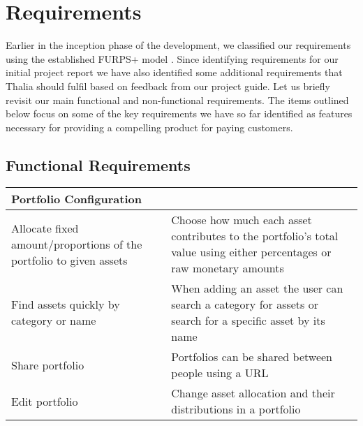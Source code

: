 \documentclass[main.tex]{subfiles}
\begin{document}
\section{Requirements}
Earlier in the inception phase of the development, we classified our requirements using the established FURPS+ model \cite{FURPS}. Since identifying requirements for our initial project report \cite{TR_REQS} we have also identified some additional requirements that Thalia should fulfil based on feedback from our project guide. Let us briefly revisit our main functional and non-functional requirements. The items outlined below focus on some of the key requirements we have so far identified as features necessary for providing a compelling product for paying customers.

\subsection{Functional Requirements}
 
{
\setlength{\tabcolsep}{30pt}
\renewcommand{\arraystretch}{2}
\centering
{}
\begin{tabularx}{\linewidth}{|X|X|}
\hline
 \textbf{Portfolio Configuration}  &  \\
 \hline
 Allocate fixed amount/proportions of the portfolio to given assets & Choose how much each asset contributes to the portfolio's total value using either percentages or raw monetary amounts \\
\hline
Find assets quickly by category or name & When adding an asset the user can search a category for assets or search for a specific asset by its name \\
\hline
Share portfolio & Portfolios can be shared between people using a URL \\
\hline
Edit portfolio & Change asset allocation and their distributions in a portfolio \\
\hline
\end{tabularx}
}
\end{document}
